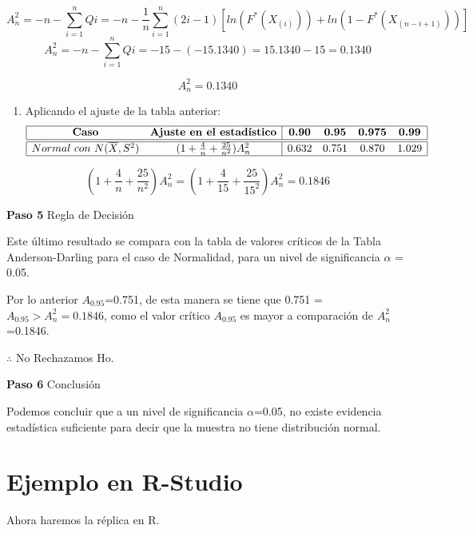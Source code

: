 \documentclass[a4paper,oneside,openany]{book}
\providecommand{\tightlist}{%
  \setlength{\itemsep}{0pt}\setlength{\parskip}{0pt}}
\begin{document}
\[A_n^2=-n-\sum_{i=1}^{n}Qi=-n-\frac{1}{n}\sum_{i=1}^{n}\left(2i-1\right)[ln(F^*(X_{(i)})) +ln(1-F^*(X_{(n-i+1)}))]\]
\[A_n^2=-n-\sum_{i=1}^{n}Qi=-15-(-15.1340)=15.1340-15=0.1340\]

\[A_n^2=0.1340\]

\begin{enumerate}
\def\labelenumi{\arabic{enumi})}
\setcounter{enumi}{7}
\tightlist
\item
  Aplicando el ajuste de la tabla anterior: \[
  \begin{equation*}
  \begin{array}{|c c| c c c c|}
  \hline
  \textbf{Caso} & \textbf{Ajuste en el estadístico} &\textbf{0.90} &\textbf{0.95} & \textbf{0.975} & \textbf{0.99} \\
  \hline
  \hline
  Normal\ con\ N(\overline{X},S^2) & (1+\frac{4}{n}+\frac{25}{n^2})A_{n}^{2} & 0.632 & 0.751 & 0.870 & 1.029 \\
  \hline
  \end{array}
  \end{equation*}
  \]
\end{enumerate}

\[ (1+\frac{4}{n}+\frac{25}{n^2})A_{n}^{2}=(1+\frac{4}{15}+\frac{25}{15^2})A_{n}^{2}=0.1846\]

\textbf{Paso 5} Regla de Decisión

Este último resultado se compara con la tabla de valores críticos de la
Tabla Anderson-Darling para el caso de Normalidad, para un nivel de
significancia \(\alpha\) = 0.05.

Por lo anterior \(A_{0.95}\)=0.751, de esta manera se tiene que 0.751 =
\(A_{0.95} > A_{n}^2=0.1846\), como el valor crítico \(A_{0.95}\) es
mayor a comparación de \(A_{n}^2\)=0.1846.

\(\therefore\) No Rechazamos Ho.

\textbf{Paso 6} Conclusión

Podemos concluir que a un nivel de significancia \(\alpha\)=0.05, no
existe evidencia estadística suficiente para decir que la muestra no
tiene distribución normal.

\section{Ejemplo en R-Studio}\label{ejemplo-en-r-studio-17}

Ahora haremos la réplica en R.
\end{document}
